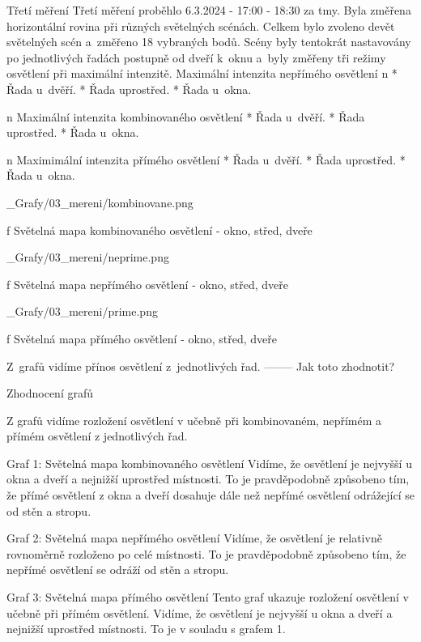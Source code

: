 \sec Třetí měření
Třetí měření proběhlo 6.3.2024 - 17:00 - 18:30 za tmy. Byla změřena horizontální rovina při různých světelných scénách.
Celkem bylo zvoleno devět světelných scén a~změřeno 18 vybraných bodů. Scény byly tentokrát nastavovány po jednotlivých
řadách postupně od dveří k~oknu a~byly změřeny tři režimy osvětlení při maximální intenzitě.
\medskip
{\sbf Maximální intenzita nepřímého osvětlení}
\medskip
\begitems \style n
    * Řada u~dvěří.
    * Řada uprostřed.
    * Řada u~okna.
\enditems

\medskip
\begitems \style n
{\sbf Maximální intenzita kombinovaného osvětlení}
\medskip
    * Řada u~dvěří.
    * Řada uprostřed.
    * Řada u~okna.
\enditems
\medskip

\begitems \style n
{\sbf Maximimální intenzita přímého osvětlení}
\medskip
    * Řada u~dvěří.
    * Řada uprostřed.
    * Řada u~okna.
\enditems

\medskip {}
\picw=18cm _Grafy/03_mereni/kombinovane.png
\caption/f Světelná mapa kombinovaného osvětlení - okno, střed, dveře
\medskip

\medskip {}
\picw=18cm _Grafy/03_mereni/neprime.png
\caption/f Světelná mapa nepřímého osvětlení - okno, střed, dveře
\medskip

\medskip {}
\picw=18cm _Grafy/03_mereni/prime.png
\caption/f Světelná mapa přímého osvětlení - okno, střed, dveře
\medskip

Z~grafů vidíme přínos osvětlení z~jednotlivých řad. -------- Jak toto zhodnotit?

\medskip
Zhodnocení grafů

Z grafů vidíme rozložení osvětlení v učebně při kombinovaném, nepřímém a přímém osvětlení z jednotlivých řad.

Graf 1: Světelná mapa kombinovaného osvětlení
Vidíme, že osvětlení je nejvyšší u okna a dveří a nejnižší uprostřed místnosti.
To je pravděpodobně způsobeno tím, že přímé osvětlení z okna a dveří dosahuje dále než nepřímé osvětlení
odrážející se od stěn a stropu.

Graf 2: Světelná mapa nepřímého osvětlení
Vidíme, že osvětlení je relativně rovnoměrně rozloženo po celé místnosti. To je pravděpodobně způsobeno tím,
že nepřímé osvětlení se odráží od stěn a stropu.

Graf 3: Světelná mapa přímého osvětlení
Tento graf ukazuje rozložení osvětlení v učebně při přímém osvětlení. Vidíme, že osvětlení je nejvyšší
u okna a dveří a nejnižší uprostřed místnosti. To je v souladu s grafem 1.




